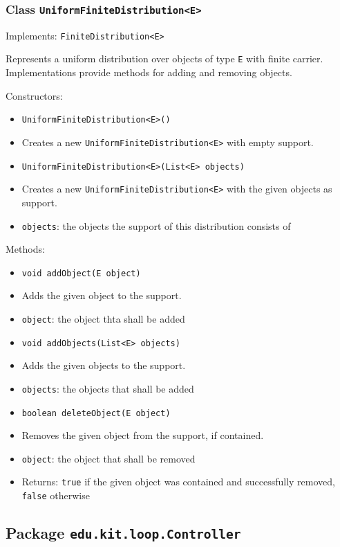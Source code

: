 \documentclass[parskip=full,11pt]{scrartcl}
\begin{document}
\subsubsection{Class \texttt{UniformFiniteDistribution<E>}}
Implements: \texttt{FiniteDistribution<E>}

Represents a uniform distribution over objects of type \texttt{E} with finite carrier. Implementations provide methods for adding and removing objects.

Constructors:
\begin{itemize}\itemsep -10pt
\item \texttt{UniformFiniteDistribution<E>()}
\item[] Creates a new \texttt{UniformFiniteDistribution<E>} with empty support.

\item \texttt{UniformFiniteDistribution<E>(List<E> objects)}
\item[] Creates a new \texttt{UniformFiniteDistribution<E>} with the given objects as support.
\item[] \texttt{objects}: the objects the support of this distribution consists of
\end{itemize}

Methods:
\begin{itemize}\itemsep -10pt
\item \texttt{void addObject(E object)}
\item[] Adds the given object to the support.
\item[] \texttt{object}: the object thta shall be added

\item \texttt{void addObjects(List<E> objects)}
\item[] Adds the given objects to the support.
\item[] \texttt{objects}: the objects that shall be added

\item \texttt{boolean deleteObject(E object)}
\item[] Removes the given object from the support, if contained.
\item[] \texttt{object}: the object that shall be removed
\item[] Returns: \texttt{true} if the given object was contained and successfully removed, \texttt{false} otherwise
\end{itemize}

\subsection{Package \texttt{edu.kit.loop.Controller}}
\end{document}
